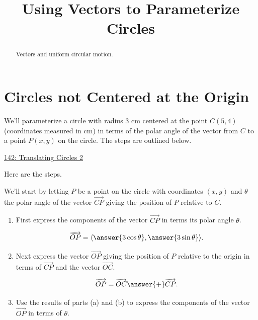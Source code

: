 \documentclass{ximera}
\title{Using Vectors to Parameterize Circles}
\begin{document}
\begin{abstract}
Vectors and uniform circular motion.
\end{abstract}
\maketitle

\section{Circles not Centered at the Origin}


\begin{question}  \label{ExKdfeKR}
We'll parameterize a circle with radius $3$ cm centered at the point $C(5,4)$ (coordinates measured in cm) in terms of the polar angle of the vector from $C$ to a point $P(x,y)$ on the circle. The steps are outlined below.

\begin{onlineOnly}
    \begin{center}
\end{center}
\end{onlineOnly}

\href{https://www.desmos.com/calculator/vpumbb440s}{142: Translating Circles 2}


\begin{explanation} 

Here are the steps.

We'll start by letting $P$ be a point on the circle with coordinates $(x,y)$ and $\theta$ the polar angle of the vector $\overrightarrow{CP}$ giving the position of $P$ relative to $C$.

\begin{enumerate}
\item First express the components of the vector $\overrightarrow{CP}$ in terms its polar angle $\theta$.

\[
     \overrightarrow{OP} = \langle \answer{3\cos\theta} , \answer{3 \sin\theta} \rangle.
\]

\item Next express the vector $\overrightarrow{OP}$ giving the position of $P$ relative to the origin in terms of $\overrightarrow{CP}$ and the vector $\overrightarrow{OC}$.

\[
  \overrightarrow{OP} = \overrightarrow{OC} \answer{+} \overrightarrow{CP}.
\]

\item Use the results of parts (a) and (b) to express the components of the vector $\overrightarrow{OP}$ in terms of $\theta$.


\end{enumerate}
\end{explanation}
\end{question}
\end{document}
